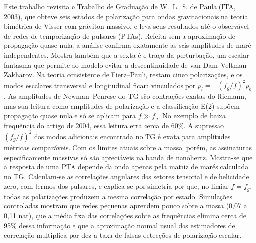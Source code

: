 Este trabalho revisita o Trabalho de Graduação de W.~L.~S. de Paula
(ITA, 2003), que obteve seis estados de polarização para ondas
gravitacionais na teoria bimétrica de Visser com gráviton massivo, e
leva seus resultados até o observável de redes de temporização de
pulsares (PTAs). Refeita sem a aproximação de propagação quase nula, a
análise confirma exatamente as seis amplitudes de maré independentes.
Mostra também que a sexta é o traço da perturbação, um escalar fantasma
que permite ao modelo evitar a descontinuidade de van
Dam--Veltman--Zakharov. Na teoria consistente de Fierz--Pauli, restam
cinco polarizações, e os modos escalares transversal e longitudinal ficam
vinculados por $p_l=-(f_g/f)^2p_b$. As amplitudes de Newman--Penrose do
TG são contrações exatas do Riemann, mas sua leitura como amplitudes de
polarização e a classificação E(2) supõem propagação quase nula e só se
aplicam para $f\gg f_g$. No exemplo de baixa frequência do artigo de
2004, essa leitura erra cerca de 60\%. A supressão
$(f_g/f)^2$ dos modos adicionais encontrada no TG é exata para
amplitudes métricas comparáveis. Com os limites atuais sobre a massa,
porém, as assinaturas especificamente massivas só são apreciáveis na
banda de nanohertz. Mostra-se que a resposta de uma PTA depende da onda
apenas pela matriz de marés calculada no TG. Calculam-se as correlações
angulares dos setores tensorial e de helicidade zero, com termos dos
pulsares, e explica-se por simetria por que, no limiar $f=f_g$, todas as
polarizações produzem a mesma correlação por estado. Simulações
controladas mostram que redes pequenas aprendem pouco sobre a massa
(0,07 a 0,11 nat), que a média fixa das correlações sobre as frequências
elimina cerca de 95\% dessa informação e que a aproximação normal usual dos estimadores de
correlação multiplica por dez a taxa de falsas detecções de polarização
escalar.
